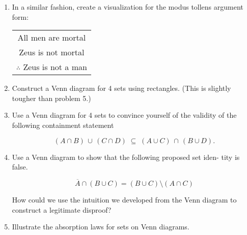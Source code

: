 \documentclass{amsart}
\begin{document}
\begin{enumerate}
\vspace{.2in}


\medskip

\newpage

\item In a similar fashion, create a visualization for the modus tollens
argument form:

\vspace{.2in}

\begin{tabular}{c}
All men are mortal \\
Zeus is not mortal \\ \hline
$\therefore$ Zeus is not a man
\end{tabular}

\vspace{.2in}



\medskip

\newpage

\item Construct a Venn diagram for 4 sets using rectangles. (This is
slightly tougher than problem 5.)

\vfill



\item Use a Venn diagram for 4 sets to convince yourself of the validity
of the following containment statement

\[
(A \cap B) \, \cup \, (C \cap D) \; \subseteq \; (A \cup C) \, \cap \, (B \cup D).
\]

\vfill

\newpage

\item Use a Venn diagram to show that the following proposed set iden-
tity is false.

\[
\overline{A} \cap (B \cup C) = (B \cup C) \setminus (A \cap C)
\]

How could we use the intuition we developed from the Venn
diagram to construct a legitimate disproof? 
\medskip

\centerline{}

\newpage

\item Illustrate the absorption laws for sets on Venn diagrams.


\end{enumerate}
\end{document}
